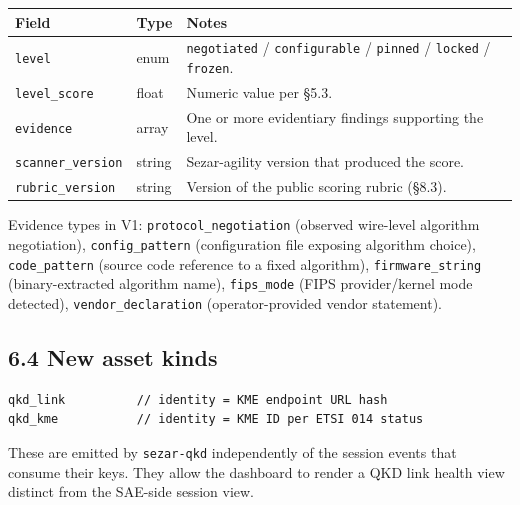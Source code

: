 \begin{longtable}[]{@{}
  >{\raggedright\arraybackslash}p{}
  >{\raggedright\arraybackslash}p{}
  >{\raggedright\arraybackslash}p{}@{}}
\toprule\noalign{}
\begin{minipage}[b]{\linewidth}\raggedright
Field
\end{minipage} & \begin{minipage}[b]{\linewidth}\raggedright
Type
\end{minipage} & \begin{minipage}[b]{\linewidth}\raggedright
Notes
\end{minipage} \\
\midrule\noalign{}
\endhead
\bottomrule\noalign{}
\endlastfoot
\texttt{level} & enum & \texttt{negotiated} / \texttt{configurable} /
\texttt{pinned} / \texttt{locked} / \texttt{frozen}. \\
\texttt{level\_score} & float & Numeric value per §5.3. \\
\texttt{evidence} & array & One or more evidentiary findings supporting
the level. \\
\texttt{scanner\_version} & string & Sezar-agility version that produced
the score. \\
\texttt{rubric\_version} & string & Version of the public scoring rubric
(§8.3). \\
\end{longtable}

Evidence types in V1: \texttt{protocol\_negotiation} (observed
wire-level algorithm negotiation), \texttt{config\_pattern}
(configuration file exposing algorithm choice), \texttt{code\_pattern}
(source code reference to a fixed algorithm), \texttt{firmware\_string}
(binary-extracted algorithm name), \texttt{fips\_mode} (FIPS
provider/kernel mode detected), \texttt{vendor\_declaration}
(operator-provided vendor statement).

\subsection{6.4 New asset kinds}\label{new-asset-kinds}

\begin{verbatim}
qkd_link          // identity = KME endpoint URL hash
qkd_kme           // identity = KME ID per ETSI 014 status
\end{verbatim}

These are emitted by \texttt{sezar-qkd} independently of the session
events that consume their keys. They allow the dashboard to render a QKD
link health view distinct from the SAE-side session view.

